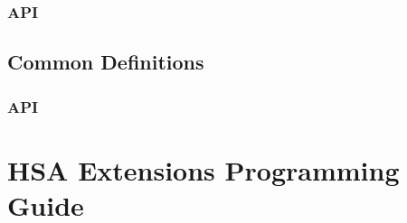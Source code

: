\documentclass[oneside]{book}
\begin{document}


\subsection{API}



\newpage

\section{Common Definitions}\label{sec:other}
\subsection{API}



\chapter{HSA Extensions Programming Guide}
\end{document}
